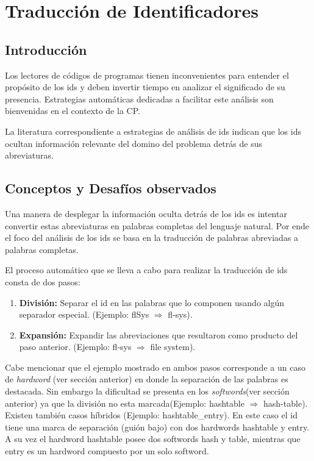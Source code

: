 \documentclass[12pt]{report}
\begin{document}
\pagebreak
\section{Traducción de Identificadores}

\subsection{Introducción}

Los lectores de códigos de programas tienen inconvenientes para entender el propósito de los ids y deben invertir tiempo en analizar el significado de su presencia. Estrategias automáticas dedicadas a facilitar este análisis son bienvenidas en el contexto de la CP.

La literatura correspondiente a estrategias de análisis de ids indican que los ids ocultan información relevante del domino del problema detrás de sus abreviaturas\cite{EHPV09,LFBEX07}. 

\subsection{Conceptos y Desafíos observados}

Una manera de desplegar la información oculta detrás de los ids es intentar convertir estas abreviaturas en palabras completas del lenguaje natural. Por ende el foco del análisis de los ids se basa en la traducción de palabras abreviadas a palabras completas.

El proceso automático que se lleva a cabo para realizar la traducción de ids consta de dos pasos\cite{LFBEX07}:

\begin{enumerate}
\itemsep0em%
\item \textbf{División:} Separar el id en las palabras que lo componen usando algún separador especial. (Ejemplo: \textsf{flSys} $\Rightarrow$ \textsf{fl-sys}).

\item \textbf{Expansión:} Expandir las abreviaciones que resultaron como producto del paso anterior. (Ejemplo: \textsf{fl-sys} $\Rightarrow$ \textsf{file system}).
\end{enumerate}

Cabe mencionar que el ejemplo mostrado en ambos pasos corresponde a un caso de \textit{hardword} (ver sección anterior) en donde la separación de las palabras es destacada. Sin embargo la dificultad se presenta en los \textit{softwords}(ver sección anterior) ya que la división no esta marcada(Ejemplo: \textsf{hashtable} $\Rightarrow$ \textsf{hash-table}). Existen también casos híbridos (Ejemplo: \textsf{hashtable\_entry}). En este caso el id tiene una marca de separación (guión bajo) con dos hardwords \textsf{hashtable} y \textsf{entry}. A su vez el hardword \textsf{hashtable} posee dos softwords \textsf{hash} y \textsf{table}, mientras que \textsf{entry} es un hardword compuesto por un solo softword. 
\end{document}
